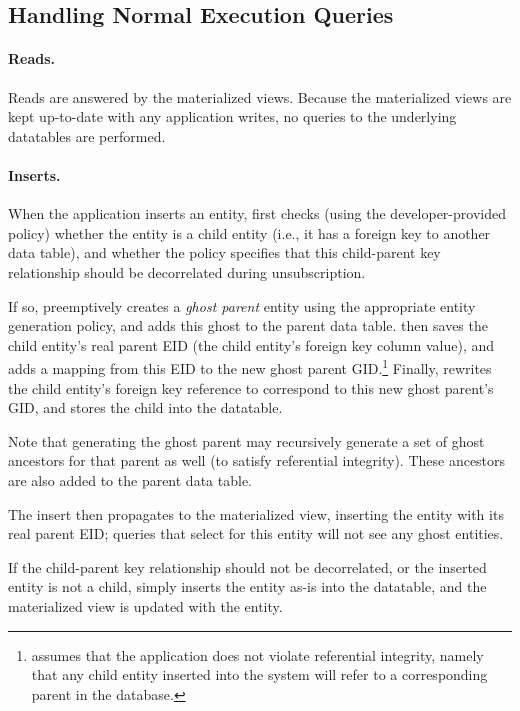 \subsection{Handling Normal Execution Queries}
\paragraph{Reads.}
Reads are answered by the materialized views. Because the materialized views are kept up-to-date with any application
writes, no queries to the underlying datatables are performed.

\paragraph{Inserts.}
When the application inserts an entity, \sys first checks (using the developer-provided policy)
whether the entity is a child entity (i.e., it has a foreign key to another data table), and
whether the policy specifies that this child-parent key relationship should be decorrelated during
unsubscription. 

If so, \sys preemptively creates a \emph{ghost parent} entity using the appropriate entity
generation policy, and adds this ghost to the parent data table. \sys then saves the child
entity's real parent EID (the child entity's foreign key column value), and adds a mapping from this
EID to the new ghost parent GID.\footnote{\sys assumes that the application does not violate
referential integrity, namely that any child entity inserted into the system will refer to a
corresponding parent in the database.} Finally, \sys rewrites the child entity's foreign key
reference to correspond to this new ghost parent's GID, and stores the child into the datatable.

Note that generating the ghost parent may recursively generate a set of ghost ancestors for that
parent as well (to satisfy referential integrity). These ancestors are also added to the parent data
table.

The insert then propagates to the materialized view, inserting the entity with its real parent EID; queries that
select for this entity will not see any ghost entities. 

If the child-parent key relationship should not be decorrelated, or the inserted entity is not a
child, \sys simply inserts the entity as-is into the datatable, and the materialized view is
updated with the entity.

